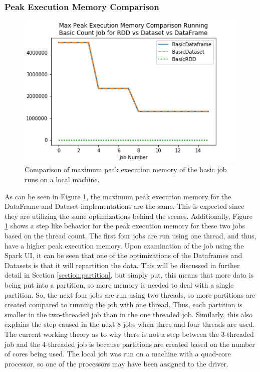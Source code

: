\documentclass[conference]{IEEEtran}
\begin{document}
\subsubsection{Peak Execution Memory Comparison}
\begin{figure}
    \includegraphics[width=\linewidth]{../python_scripts/images/basicJobMaxPeakExecutionMemory.png}
    \caption{Comparison of maximum peak execution memory of the basic job runs on a local machine.}
    \label{fig:basicJobMaxPeakExecutionMemory}
\end{figure}

As can be seen in Figure \ref{fig:basicJobMaxPeakExecutionMemory}, the maximum peak execution memory for the DataFrame and Dataset implementations are the same.
This is expected since they are utilizing the same optimizations behind the scenes.
Additionally, Figure \ref{fig:basicJobMaxPeakExecutionMemory} shows a step like behavior for the peak execution memory for these two jobs based on the thread count.
The first four jobs are run using one thread, and thus, have a higher peak execution memory.
Upon examination of the job using the Spark UI, it can be seen that one of the optimizations of the Dataframes and Datasets is that it will repartition the data.
This will be discussed in further detail in Section \ref{section:partition}, but simply put, this means that more data is being put into a partition, so more memory is needed to deal with a single partition.
So, the next four jobs are run using two threads, so more partitions are created compared to running the job with one thread.
Thus, each partition is smaller in the two-threaded job than in the one threaded job.
Similarly, this also explains the step caused in the next 8 jobs when three and four threads are used.
The current working theory as to why there is not a step between the 3-threaded job and the 4-threaded job is because partitions are created based on the number of cores being used.
The local job was run on a machine with a quad-core processor, so one of the processors may have been assigned to the driver.
\end{document}
